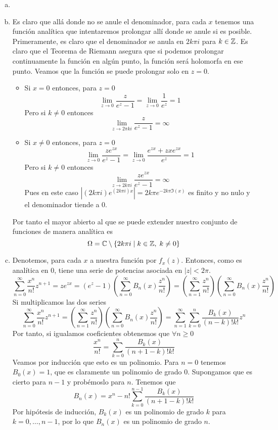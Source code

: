 \documentclass[twoside]{article}
\begin{document}
\begin{solucion}
\begin{enumerate}[(a)]
\item[]
\item Es claro que allá donde no se anule el denominador, para cada $x$ tenemos una función analítica que intentaremos prolongar allí donde se anule si es posible. Primeramente, es claro que el denominador se anula en $2k\pi i$ para $k\in \mathbb{Z}$. Es claro que el Teorema de Riemann asegura que si podemos prolongar continuamente la función en algún punto, la función será holomorfa en ese punto. Veamos que la función se puede prolongar solo en $z=0$.
\begin{itemize}
\item Si $x=0$ entonces, para $z=0$
$$
\lim_{z\to 0}\frac{z}{e^z-1} = \lim_{z\to 0}\frac{1}{e^z} = 1
$$
Pero si $k\neq 0$ entonces
$$
\lim_{z\to 2\pi k i}\frac{z}{e^z-1} = \infty
$$
\item Si $x\neq 0$ entonces, para $z=0$
$$
\lim_{z\to 0}\frac{ze^{zx}}{e^z-1} = \lim_{z\to 0}\frac{e^{zx}+zxe^{zx}}{e^z} = 1
$$
Pero si $k\neq 0$ entonces
$$
\lim_{z\to 2k\pi i}\frac{ze^{zx}}{e^z-1} = \infty
$$
Pues en este caso $|(2k\pi i)e^{(2k\pi i)x}| = 2k\pi e^{-2k\pi \Im(x)}$ es finito y no nulo y el denominador tiende a $0$.
\end{itemize}
Por tanto el mayor abierto al que se puede extender nuestro conjunto de funciones de manera analítica es
$$
\Omega = \mathbb{C}\setminus\{2k\pi i \mid k\in \mathbb{Z},\; k\neq 0\}
$$
\item Denotemos, para cada $x$ a nuestra función por $f_x(z)$. Entonces, como es analítica en $0$, tiene una serie de potencias asociada en $|z|<2\pi$. 
\[ \sum_{n=0}^\infty \frac{x^n}{n!}z^{n+1}= z e^{zx} =(e^z-1) \left(\sum_{n=0}^\infty B_n(x) \frac{z^n}{n!}\right)=\left( \sum_{n=1}^\infty \frac{z^n}{n!}\right)\left(\sum_{n=0}^\infty B_n(x) \frac{z^n}{n!}\right)\]
Si multiplicamos las dos series
\[ \sum_{n=0}^\infty \frac{x^n}{n!}z^{n+1}= \left( \sum_{n=1}^\infty \frac{z^n}{n!}\right)\left(\sum_{n=0}^\infty B_n(x) \frac{z^n}{n!}\right) = \sum_{n=1}^\infty\sum_{k=0}^{n}\frac{B_k(x)}{(n-k)!k!} z^n \]
Por tanto, si igualamos coeficientes obtenemos que $\forall n\geq 0$
$$
\frac{x^{n}}{n!} = \sum_{k=0}^{n} \frac{B_k(x)}{(n+1-k)!k!}
$$
Veamos por inducción que esto es un polinomio. Para $n=0$ tenemos $B_0(x) = 1$, que es claramente un polinomio de grado $0$. Supongamos que es cierto para $n-1$ y probémoslo para $n$. Tenemos que
$$
B_n(x) = x^n - n!\sum_{k=0}^{n-1} \frac{B_k(x)}{(n+1-k)!k!}
$$
Por hipótesis de inducción, $B_k(x)$ es un polinomio de grado $k$ para $k=0,\dotsc,n-1$, por lo que $B_n(x)$ es un polinomio de grado $n$.

\end{enumerate}
\end{solucion}
\end{document}
